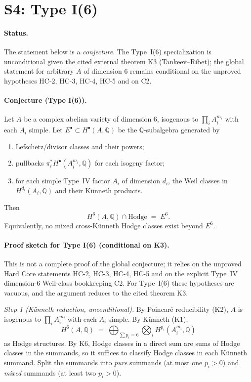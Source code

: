 \documentclass{article}
\begin{document}
\section*{S4: Type I(6)}

\paragraph{Status.} The statement below is a \emph{conjecture}. The Type~I(6) specialization is unconditional given the cited external theorem K3 (Tankeev--Ribet); the global statement for arbitrary $A$ of dimension $6$ remains conditional on the unproved hypotheses HC-2, HC-3, HC-4, HC-5 and on C2.

\paragraph{Conjecture (Type I(6)).}
Let $A$ be a complex abelian variety of dimension $6$, isogenous to $\prod_i A_i^{m_i}$ with each $A_i$ simple. Let $E^\bullet \subset H^\bullet(A,\mathbb{Q})$ be the $\mathbb{Q}$-subalgebra generated by
\begin{enumerate}
  \item[(i)] Lefschetz/divisor classes and their powers;
  \item[(ii)] pullbacks $\pi_i^* H^\bullet(A_i^{m_i},\mathbb{Q})$ for each isogeny factor;
  \item[(iii)] for each simple Type~IV factor $A_i$ of dimension $d_i$, the Weil classes in $H^{d_i}(A_i,\mathbb{Q})$ and their K\"unneth products.
\end{enumerate}
Then
\[
H^6(A,\mathbb{Q}) \cap \mathrm{Hodge} \;=\; E^6.
\]
Equivalently, no mixed cross-K\"unneth Hodge classes exist beyond $E^6$.

\paragraph{Proof sketch for Type I(6) (conditional on K3).}
This is not a complete proof of the global conjecture; it relies on the unproved Hard Core statements HC-2, HC-3, HC-4, HC-5 and on the explicit Type~IV dimension-$6$ Weil-class bookkeeping C2. For Type~I(6) these hypotheses are vacuous, and the argument reduces to the cited theorem K3.

\emph{Step 1 (K\"unneth reduction, unconditional).} By Poincar\'e reducibility (K2), $A$ is isogenous to $\prod_i A_i^{m_i}$ with each $A_i$ simple. By K\"unneth (K1),
\[
H^6(A,\mathbb{Q}) \;=\; \bigoplus_{\sum p_i = 6} \bigotimes_i H^{p_i}(A_i^{m_i},\mathbb{Q})
\]
as Hodge structures. By K6, Hodge classes in a direct sum are sums of Hodge classes in the summands, so it suffices to classify Hodge classes in each K\"unneth summand. Split the summands into \emph{pure} summands (at most one $p_i > 0$) and \emph{mixed} summands (at least two $p_i > 0$).
\end{document}

